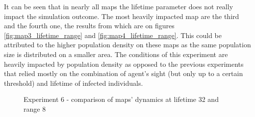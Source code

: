 It can be seen that in nearly all maps the lifetime parameter does not really impact the simulation outcome.
The most heavily impacted map are the third and the fourth one, the results from which are on figures \ref{fig:map3_lifetime_range} and \ref{fig:map4_lifetime_range}.
This could be attributed to the higher population density on these maps as the same population size is distributed on a smaller area.
The conditions of this experiment are heavily impacted by population density as opposed to the previous experiments that relied mostly on the combination of agent's sight (but only up to a certain threshold) and lifetime of infected individuals.

\begin{figure}[H]
    \centering

    \hspace*{\fill}

    \hspace*{\fill}

    \caption{Experiment 6 - comparison of maps' dynamics at lifetime 32 and range 8}\label{fig:maps_limited_range}
\end{figure}

